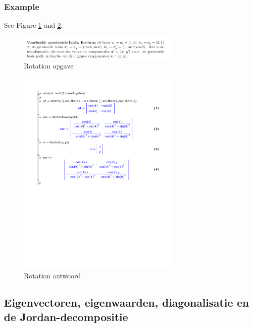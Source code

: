 \documentclass[a4paper]{report}
\begin{document}
\subsubsection{Example}

See Figure \ref{fig:rotation} and \ref{fig:rotationex}.

\begin{figure}[htbp!]
	\begin{center}
		\includegraphics[width=0.7\textwidth]{./images/rotation.png}
	\end{center}
	\caption{Rotation opgave}
	\label{fig:rotation}
\end{figure}

\begin{figure}[htbp!]
	\begin{center}
		\includegraphics[width=0.7\textwidth]{./rotation.pdf}
	\end{center}
	\caption{Rotation antwoord}
	\label{fig:rotationex}
\end{figure}

\subsection{Eigenvectoren, eigenwaarden, diagonalisatie en de Jordan-decompositie}
\end{document}
